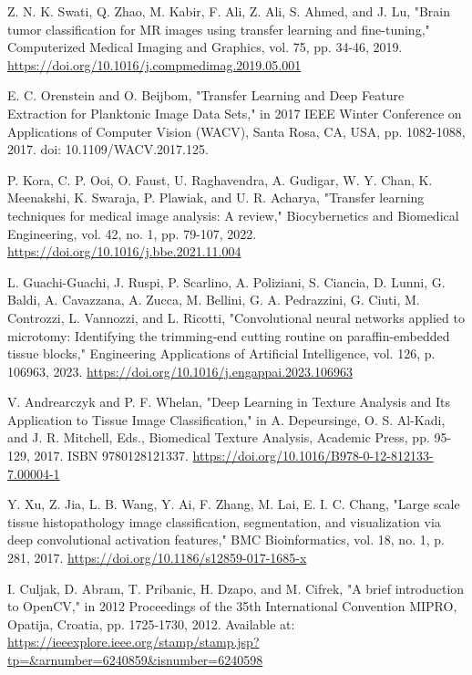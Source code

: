 \begin{thebibliography}{99}
    Z. N. K. Swati, Q. Zhao, M. Kabir, F. Ali, Z. Ali, S. Ahmed, and J. Lu, "Brain tumor classification for MR images using transfer learning and fine-tuning," Computerized Medical Imaging and Graphics, vol. 75, pp. 34-46, 2019. \url{https://doi.org/10.1016/j.compmedimag.2019.05.001}
    
    E. C. Orenstein and O. Beijbom, "Transfer Learning and Deep Feature Extraction for Planktonic Image Data Sets," in 2017 IEEE Winter Conference on Applications of Computer Vision (WACV), Santa Rosa, CA, USA, pp. 1082-1088, 2017. doi: 10.1109/WACV.2017.125.
    
    P. Kora, C. P. Ooi, O. Faust, U. Raghavendra, A. Gudigar, W. Y. Chan, K. Meenakshi, K. Swaraja, P. Plawiak, and U. R. Acharya, "Transfer learning techniques for medical image analysis: A review," Biocybernetics and Biomedical Engineering, vol. 42, no. 1, pp. 79-107, 2022. \url{https://doi.org/10.1016/j.bbe.2021.11.004}
    
    L. Guachi-Guachi, J. Ruspi, P. Scarlino, A. Poliziani, S. Ciancia, D. Lunni, G. Baldi, A. Cavazzana, A. Zucca, M. Bellini, G. A. Pedrazzini, G. Ciuti, M. Controzzi, L. Vannozzi, and L. Ricotti, "Convolutional neural networks applied to microtomy: Identifying the trimming-end cutting routine on paraffin-embedded tissue blocks," Engineering Applications of Artificial Intelligence, vol. 126, p. 106963, 2023. \url{https://doi.org/10.1016/j.engappai.2023.106963}
    
    V. Andrearczyk and P. F. Whelan, "Deep Learning in Texture Analysis and Its Application to Tissue Image Classification," in A. Depeursinge, O. S. Al-Kadi, and J. R. Mitchell, Eds., Biomedical Texture Analysis, Academic Press, pp. 95-129, 2017. ISBN 9780128121337. \url{https://doi.org/10.1016/B978-0-12-812133-7.00004-1}
    
    Y. Xu, Z. Jia, L. B. Wang, Y. Ai, F. Zhang, M. Lai, E. I. C. Chang, "Large scale tissue histopathology image classification, segmentation, and visualization via deep convolutional activation features," BMC Bioinformatics, vol. 18, no. 1, p. 281, 2017. \url{https://doi.org/10.1186/s12859-017-1685-x}
    
    I. Culjak, D. Abram, T. Pribanic, H. Dzapo, and M. Cifrek, "A brief introduction to OpenCV," in 2012 Proceedings of the 35th International Convention MIPRO, Opatija, Croatia, pp. 1725-1730, 2012. Available at: \url{https://ieeexplore.ieee.org/stamp/stamp.jsp?tp=&arnumber=6240859&isnumber=6240598}
    

\end{thebibliography}
